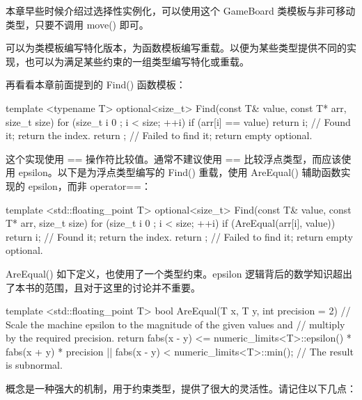 本章早些时候介绍过选择性实例化，可以使用这个 GameBoard 类模板与非可移动类型，只要不调用 move() 即可。


可以为类模板编写特化版本，为函数模板编写重载。以便为某些类型提供不同的实现，也可以为满足某些约束的一组类型编写特化或重载。

再看看本章前面提到的 Find() 函数模板：

\begin{cpp}
template <typename T>
optional<size_t> Find(const T& value, const T* arr, size_t size)
{
    for (size_t i { 0 }; i < size; ++i) {
        if (arr[i] == value) {
            return i; // Found it; return the index.
            }
        }
    return {}; // Failed to find it; return empty optional.
}
\end{cpp}

这个实现使用 == 操作符比较值。通常不建议使用 == 比较浮点类型，而应该使用 epsilon。以下是为浮点类型编写的 Find() 重载，使用 AreEqual() 辅助函数实现的 epsilon，而非 operator==：

\begin{cpp}
template <std::floating_point T>
optional<size_t> Find(const T& value, const T* arr, size_t size)
{
    for (size_t i { 0 }; i < size; ++i) {
        if (AreEqual(arr[i], value)) {
            return i; // Found it; return the index.
        }
    }
    return {}; // Failed to find it; return empty optional.
}
\end{cpp}

AreEqual() 如下定义，也使用了一个类型约束。epsilon 逻辑背后的数学知识超出了本书的范围，且对于这里的讨论并不重要。

\begin{cpp}
template <std::floating_point T>
bool AreEqual(T x, T y, int precision = 2)
{
    // Scale the machine epsilon to the magnitude of the given values and
    // multiply by the required precision.
    return fabs(x - y) <= numeric_limits<T>::epsilon() * fabs(x + y) * precision
        || fabs(x - y) < numeric_limits<T>::min(); // The result is subnormal.
}
\end{cpp}


概念是一种强大的机制，用于约束类型，提供了很大的灵活性。请记住以下几点：

